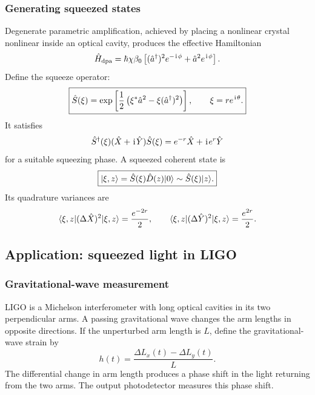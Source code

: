 \subsubsection{Generating squeezed states}
Degenerate parametric amplification, achieved by placing a nonlinear crystal nonlinear inside an optical cavity, produces the effective Hamiltonian
\begin{equation}
\hat H_{\mathrm{dpa}}
=\hbar\chi\beta_0
\left[(\hat a^\dagger)^2e^{-\hspace{1pt}\mathrm{i}\hspace{1pt}\phi}
+\hat a^2e^{\hspace{1pt}\mathrm{i}\hspace{1pt}\phi}\right].
\end{equation}
Define the squeeze operator:
\begin{equation}
\boxed{
\hat S(\xi)=
\exp\left[\frac12\left(\xi^*\hat a^2
-\xi(\hat a^\dagger)^2\right)\right],
\qquad \xi=re^{\hspace{1pt}\mathrm{i}\hspace{1pt}\theta}.}
\end{equation}
It satisfies
\begin{equation}
\hat S^\dagger(\xi)(\hat X+\hspace{1pt}\mathrm{i}\hspace{1pt}\hat Y)\hat S(\xi)
=e^{-r}\hat X+\hspace{1pt}\mathrm{i}\hspace{1pt} e^r\hat Y
\end{equation}
for a suitable squeezing phase. A squeezed coherent state is
\begin{equation}
\boxed{
|{\xi,z}\rangle=\hat S(\xi)\hat D(z)|{0}\rangle
\sim\hat S(\xi)|{z}\rangle.}
\end{equation}
Its quadrature variances are
\begin{equation}
\langle{\xi,z}|(\Delta\hat X)^2|{\xi,z}\rangle
=\frac{e^{-2r}}{2},
\qquad
\langle{\xi,z}|(\Delta\hat Y)^2|{\xi,z}\rangle
=\frac{e^{2r}}{2}.
\end{equation}


\subsection{Application: squeezed light in LIGO}

\subsubsection{Gravitational-wave measurement}

LIGO is a Michelson interferometer with long optical cavities in its two
perpendicular arms. A passing gravitational wave changes the arm lengths in
opposite directions. If the unperturbed arm length is \(L\), define the
gravitational-wave strain by
\begin{equation}
    h(t)=\frac{\Delta L_x(t)-\Delta L_y(t)}{L}.
\end{equation}
The differential change in arm length produces a phase shift in the light
returning from the two arms. The output photodetector measures this phase
shift.


